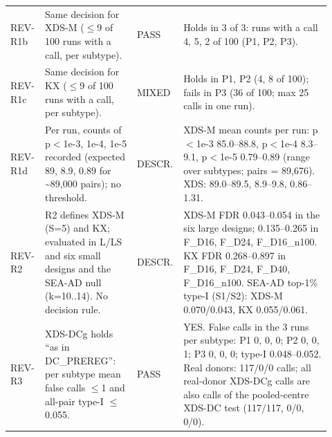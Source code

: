 \begin{table}[p]
\begin{tabular}{@{}>{\raggedright\arraybackslash}p{0.100\linewidth}>{\raggedright\arraybackslash}p{0.285\linewidth}>{\raggedright\arraybackslash}p{0.085\linewidth}>{\raggedright\arraybackslash}p{0.450\linewidth}@{}}
REV-R1b & Same decision for XDS-M ($\le$9 of 100 runs with a call, per subtype). & PASS & Holds in 3 of 3: runs with a call 4, 5, 2 of 100 (P1, P2, P3). \\
REV-R1c & Same decision for KX ($\le$9 of 100 runs with a call, per subtype). & MIXED & Holds in P1, P2 (4, 8 of 100); fails in P3 (36 of 100; max 25 calls in one run). \\
REV-R1d & Per run, counts of p$<$1e-3, 1e-4, 1e-5 recorded (expected 89, 8.9, 0.89 for \textasciitilde{}89,000 pairs); no threshold. & DESCR. & XDS-M mean counts per run: p$<$1e-3 85.0--88.8, p$<$1e-4 8.3--9.1, p$<$1e-5 0.79--0.89 (range over subtypes; pairs = 89,676). XDS: 89.0--89.5, 8.9--9.8, 0.86--1.31. \\
REV-R2 & R2 defines XDS-M (S=5) and KX; evaluated in L/LS and six small designs and the SEA-AD null (k=10..14). No decision rule. & DESCR. & XDS-M FDR 0.043--0.054 in the six large designs; 0.135--0.265 in F\_D16, F\_D24, F\_D16\_n100. KX FDR 0.268--0.897 in F\_D16, F\_D24, F\_D40, F\_D16\_n100. SEA-AD top-1\% type-I (S1/S2): XDS-M 0.070/0.043, KX 0.055/0.061. \\
REV-R3 & XDS-DCg holds ``as in DC\_PREREG'': per subtype mean false calls $\le$1 and all-pair type-I $\le$0.055. & PASS & YES. False calls in the 3 runs per subtype: P1 0, 0, 0; P2 0, 0, 1; P3 0, 0, 0; type-I 0.048--0.052. Real donors: 117/0/0 calls; all real-donor XDS-DCg calls are also calls of the pooled-centre XDS-DC test (117/117, 0/0, 0/0). \\
\bottomrule
\end{tabular}
\end{table}

